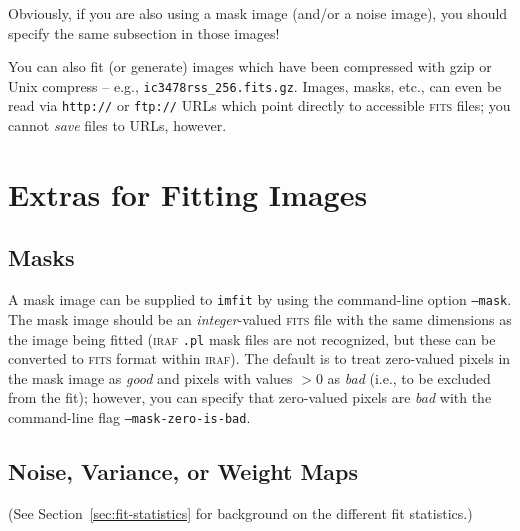 \documentclass[10pt,a4paper,article]{memoir}
\newcommand{\imfitprog}{\texttt{imfit}}
\begin{document}
Obviously, if you are also using a mask image (and/or a noise image), you should
specify the same subsection in those images!

You can also fit (or generate) images which have been compressed with gzip or
Unix compress -- e.g., \texttt{ic3478rss\_256.fits.gz}.
Images, masks, etc., can even be read via \texttt{http://} or \texttt{ftp://} URLs which point directly to
accessible \textsc{fits} files; you
cannot \textit{save} files to URLs, however.



\chapter{Extras for Fitting Images}

\section{Masks}

A mask image can be supplied to \imfitprog{} by using the command-line
option \texttt{--mask}. The mask image should be an \textit{integer}-valued
\textsc{fits} file with the same dimensions as the image being fitted (\textsc{iraf} \texttt{.pl}
mask files are not recognized, but these can be converted to \textsc{fits} format within
\textsc{iraf}). The default is to treat zero-valued pixels in the mask image as
\textit{good} and pixels with values $> 0$ as \textit{bad} (i.e., to be excluded
from the fit); however, you can specify that zero-valued pixels are \textit{bad}
with the command-line flag \texttt{--mask-zero-is-bad}.



\section{Noise, Variance, or Weight Maps}\label{sec:noise-maps}

(See Section~\ref{sec:fit-statistics} for background on the different fit statistics.)
\end{document}
